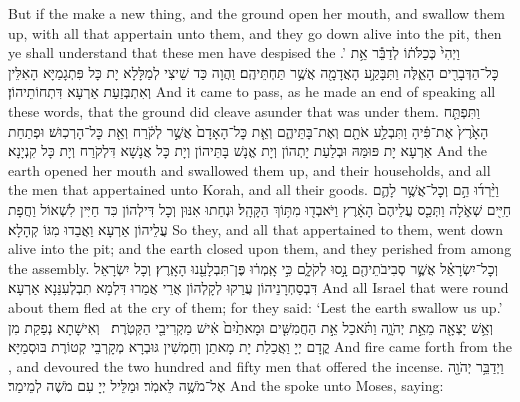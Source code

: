 {But if the \lord\space make a new thing, and the ground open her mouth, and swallow them up, with all that appertain unto them, and they go down alive into the pit, then ye shall understand that these men have despised the \lord.’}{}
{וַיְהִי֙ כְּכַלֹּת֔וֹ לְדַבֵּ֕ר אֵ֥ת כׇּל־הַדְּבָרִ֖ים הָאֵ֑לֶּה וַתִּבָּקַ֥ע הָאֲדָמָ֖ה אֲשֶׁ֥ר תַּחְתֵּיהֶֽם׃}
{וַהֲוָה כַּד שֵׁיצִי לְמַלָּלָא יָת כָּל פִּתְגָמַיָּא הָאִלֵּין וְאִתְבְּזַעַת אַרְעָא דִּתְחוֹתֵיהוֹן׃}
{And it came to pass, as he made an end of speaking all these words, that the ground did cleave asunder that was under them.}{}
{וַתִּפְתַּ֤ח הָאָ֙רֶץ֙ אֶת־פִּ֔יהָ וַתִּבְלַ֥ע אֹתָ֖ם וְאֶת־בָּתֵּיהֶ֑ם וְאֵ֤ת כׇּל־הָאָדָם֙ אֲשֶׁ֣ר לְקֹ֔רַח וְאֵ֖ת כׇּל־הָרְכֽוּשׁ׃}
{וּפְתַחַת אַרְעָא יָת פּוּמַּהּ וּבְלַעַת יָתְהוֹן וְיָת אֱנָשׁ בָּתֵּיהוֹן וְיָת כָּל אֲנָשָׁא דִּלְקֹרַח וְיָת כָּל קִנְיָנָא׃}
{And the earth opened her mouth and swallowed them up, and their households, and all the men that appertained unto Korah, and all their goods.}{}
{וַיֵּ֨רְד֜וּ הֵ֣ם וְכׇל־אֲשֶׁ֥ר לָהֶ֛ם חַיִּ֖ים שְׁאֹ֑לָה וַתְּכַ֤ס עֲלֵיהֶם֙ הָאָ֔רֶץ וַיֹּאבְד֖וּ מִתּ֥וֹךְ הַקָּהָֽל׃}
{וּנְחַתוּ אִנּוּן וְכָל דִּילְהוֹן כִּד חַיִּין לִשְׁאוֹל וַחֲפָת עֲלֵיהוֹן אַרְעָא וַאֲבַדוּ מִגּוֹ קְהָלָא׃}
{So they, and all that appertained to them, went down alive into the pit; and the earth closed upon them, and they perished from among the assembly.}{}
{וְכׇל־יִשְׂרָאֵ֗ל אֲשֶׁ֛ר סְבִיבֹתֵיהֶ֖ם נָ֣סוּ לְקֹלָ֑ם כִּ֣י אָֽמְר֔וּ פֶּן־תִּבְלָעֵ֖נוּ הָאָֽרֶץ׃
}
{וְכָל יִשְׂרָאֵל דִּבְסַחְרָנֵיהוֹן עֲרַקוּ לְקָלְהוֹן אֲרֵי אֲמַרוּ דִּלְמָא תִבְלְעִנַּנָא אַרְעָא׃}
{And all Israel that were round about them fled at the cry of them; for they said: ‘Lest the earth swallow us up.’}{}
{וְאֵ֥שׁ יָצְאָ֖ה מֵאֵ֣ת יְהֹוָ֑ה וַתֹּ֗אכַל אֵ֣ת הַחֲמִשִּׁ֤ים וּמָאתַ֙יִם֙ אִ֔ישׁ מַקְרִיבֵ֖י הַקְּטֹֽרֶת׃ \setuma }
{וְאִישָׁתָא נְפַקַת מִן קֳדָם יְיָ וַאֲכַלַת יָת מָאתַן וְחַמְשִׁין גּוּבְרָא מְקָרְבֵי קְטוֹרֶת בּוּסְמַיָּא׃}
{And fire came forth from the \lord, and devoured the two hundred and fifty men that offered the incense.}{}
\newperek
{}%
{וַיְדַבֵּ֥ר יְהֹוָ֖ה אֶל־מֹשֶׁ֥ה לֵּאמֹֽר׃}
{וּמַלֵּיל יְיָ עִם מֹשֶׁה לְמֵימַר׃}
{And the \lord\space spoke unto Moses, saying:}{}

